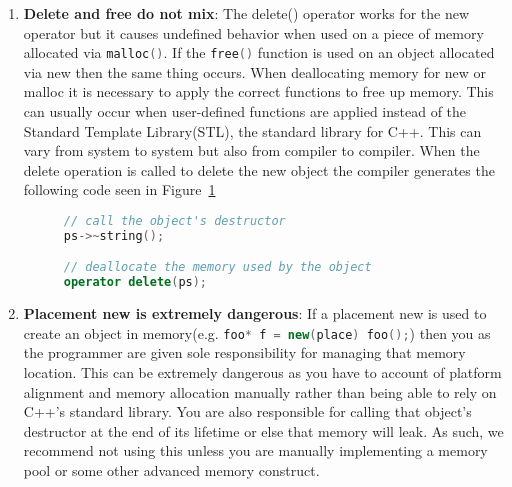 \documentclass[letterpaper, 12pt]{article}
\newcommand{\inlinecode}[1]{\colorbox{codegrey}{\lstinline[language=C++]{#1}}}
\begin{document}
\begin{enumerate}
  \item {\bfseries Delete and free do not mix}:
  The delete() operator works for the new operator but it causes undefined behavior when used 
  on a piece of memory allocated via \inlinecode{malloc()}. If the \inlinecode{free()} function 
  is used on an object allocated via new then the same thing occurs. When deallocating memory for 
  new or malloc it is necessary to apply the correct functions to free up memory. This can usually 
  occur when user-defined functions are applied instead of the Standard Template Library(STL), 
  the standard library for  C++. This can vary from system to system but also from compiler 
  to compiler. When the delete operation is called to delete the new object the compiler 
  generates the following code seen in Figure~\ref{code:delete_free_no_mix}
  \newline
  \begin{figure}
  \begin{lstlisting}[language=C++]
// call the object's destructor
ps->~string();

// deallocate the memory used by the object
operator delete(ps);
  \end{lstlisting}
  \label{code:delete_free_no_mix}
  \end{figure}
  
  \item {\bfseries Placement new is extremely dangerous}:
  If a placement new is used to create an object in memory(e.g. \inlinecode{foo* f = new(place) foo();}) 
  then you as the programmer are given sole responsibility for managing that memory location. This can
  be extremely dangerous as you have to account of platform alignment and memory allocation manually
  rather than being able to rely on C++'s standard library. You are also responsible for calling that
  object's destructor at the end of its lifetime or else that memory will leak. As such, we recommend 
  not using this unless you are manually implementing a memory pool or some other advanced memory construct.


\end{enumerate}
\end{document}

